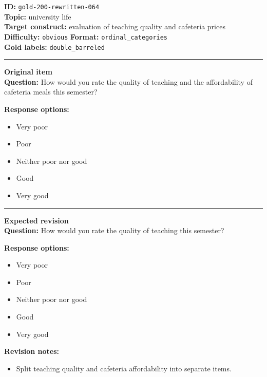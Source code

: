 \documentclass[10pt,a4paper]{article}
\newcommand{\sectionline}{\vspace{0.15em}\hrule\vspace{0.35em}}
\begin{document}
\begin{tcolorbox}[colframe=FlawRed,colback=white,colbacktitle=FlawRed!9,coltitle=black,title={Item 064\hfill Flawed item}]
\textbf{ID:} \texttt{gold-200-rewritten-064}\\
\textbf{Topic:} university life\\
\textbf{Target construct:} evaluation of teaching quality and cafeteria prices\\
\textbf{Difficulty:} \texttt{obvious} \quad \textbf{Format:} \texttt{ordinal\_categories}\\
\textbf{Gold labels:} \texttt{double\_barreled}\\
\sectionline
\textbf{Original item}\\
\textbf{Question:} How would you rate the quality of teaching and the affordability of cafeteria meals this semester?
\par\textbf{Response options:}
\begin{itemize}
\item Very poor
\item Poor
\item Neither poor nor good
\item Good
\item Very good
\end{itemize}
\sectionline
\textbf{Expected revision}\\
\textbf{Question:} How would you rate the quality of teaching this semester?
\par\textbf{Response options:}
\begin{itemize}
\item Very poor
\item Poor
\item Neither poor nor good
\item Good
\item Very good
\end{itemize}
\par\textbf{Revision notes:}
\begin{itemize}
\item Split teaching quality and cafeteria affordability into separate items.
\end{itemize}
\end{tcolorbox}
\end{document}
